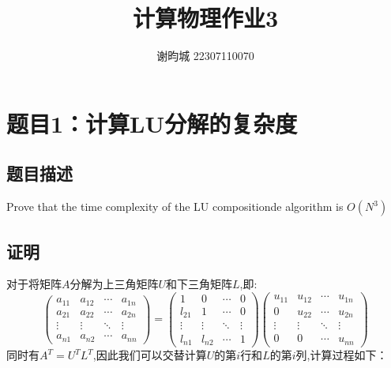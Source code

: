 \documentclass[11pt]{article}
\author{谢昀城 22307110070}
\title{计算物理作业3}
\begin{document}
\maketitle


\section{题目1：计算LU分解的复杂度}
\subsection{题目描述}
Prove that the time complexity of the LU compositionde algorithm is $O(N^3)$

\subsection{证明}
对于将矩阵$A$分解为上三角矩阵$U$和下三角矩阵$L$,即:
$$
\begin{pmatrix}
  a_{11} & a_{12} & \cdots & a_{1n} \\
  a_{21} & a_{22} & \cdots & a_{2n} \\
  \vdots & \vdots & \ddots & \vdots \\
  a_{n1} & a_{n2} & \cdots & a_{nn}
  \end{pmatrix}=\begin{pmatrix}
    1 & 0 & \cdots & 0 \\
    l_{21} & 1 & \cdots & 0 \\
    \vdots & \vdots & \ddots & \vdots \\
    l_{n1} & l_{n2} & \cdots & 1
    \end{pmatrix}
    \begin{pmatrix}
      u_{11} & u_{12} & \cdots & u_{1n} \\
      0 & u_{22} & \cdots & u_{2n} \\
      \vdots & \vdots & \ddots & \vdots \\
      0 & 0 & \cdots & u_{nn}
      \end{pmatrix}
$$
同时有$A^{T}=U^{T}L^{T}$,因此我们可以交替计算$U$的第$i$行和$L$的第$i$列,计算过程如下：
\end{document}
